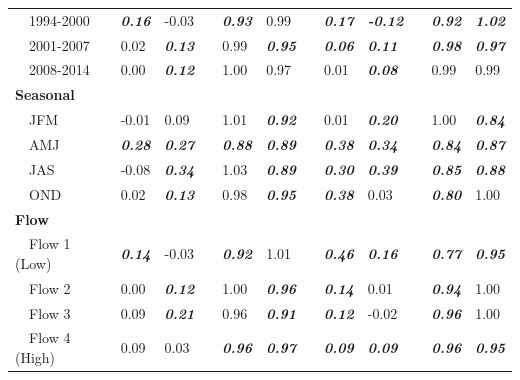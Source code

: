 \documentclass[letterpaper,12pt,oneside]{article}\usepackage[]{graphicx}\usepackage[]{color}
\begin{document}
\begin{table}[!tbp]
\begin{center}
\begin{tabular}{lllcllcllcll}
~~1994-2000&{\bf \textit{0.16}}&-0.03&&{\bf \textit{0.93}}&0.99&&{\bf \textit{0.17}}&{\bf \textit{-0.12}}&&{\bf \textit{0.92}}&{\bf \textit{1.02}}\tabularnewline
~~2001-2007&0.02&{\bf \textit{0.13}}&&0.99&{\bf \textit{0.95}}&&{\bf \textit{0.06}}&{\bf \textit{0.11}}&&{\bf \textit{0.98}}&{\bf \textit{0.97}}\tabularnewline
~~2008-2014&0.00&{\bf \textit{0.12}}&&1.00&0.97&&0.01&{\bf \textit{0.08}}&&0.99&0.99\tabularnewline
\hline
{\bfseries Seasonal}&&&&&&&&&&&\tabularnewline
~~JFM&-0.01&0.09&&1.01&{\bf \textit{0.92}}&&0.01&{\bf \textit{0.20}}&&1.00&{\bf \textit{0.84}}\tabularnewline
~~AMJ&{\bf \textit{0.28}}&{\bf \textit{0.27}}&&{\bf \textit{0.88}}&{\bf \textit{0.89}}&&{\bf \textit{0.38}}&{\bf \textit{0.34}}&&{\bf \textit{0.84}}&{\bf \textit{0.87}}\tabularnewline
~~JAS&-0.08&{\bf \textit{0.34}}&&1.03&{\bf \textit{0.89}}&&{\bf \textit{0.30}}&{\bf \textit{0.39}}&&{\bf \textit{0.85}}&{\bf \textit{0.88}}\tabularnewline
~~OND&0.02&{\bf \textit{0.13}}&&0.98&{\bf \textit{0.95}}&&{\bf \textit{0.38}}&0.03&&{\bf \textit{0.80}}&1.00\tabularnewline
\hline
{\bfseries Flow}&&&&&&&&&&&\tabularnewline
~~Flow 1 (Low)&{\bf \textit{0.14}}&-0.03&&{\bf \textit{0.92}}&1.01&&{\bf \textit{0.46}}&{\bf \textit{0.16}}&&{\bf \textit{0.77}}&{\bf \textit{0.95}}\tabularnewline
~~Flow 2&0.00&{\bf \textit{0.12}}&&1.00&{\bf \textit{0.96}}&&{\bf \textit{0.14}}&0.01&&{\bf \textit{0.94}}&1.00\tabularnewline
~~Flow 3&0.09&{\bf \textit{0.21}}&&0.96&{\bf \textit{0.91}}&&{\bf \textit{0.12}}&-0.02&&{\bf \textit{0.96}}&1.00\tabularnewline
~~Flow 4 (High)&0.09&0.03&&{\bf \textit{0.96}}&{\bf \textit{0.97}}&&{\bf \textit{0.09}}&{\bf \textit{0.09}}&&{\bf \textit{0.96}}&{\bf \textit{0.95}}\tabularnewline
\hline
\end{tabular}\end{center}

\end{table}
\end{document}

